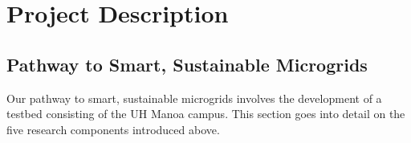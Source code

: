 \documentclass{proposalnsf}
\begin{document}

\section{Project Description}

\tableofcontents



\subsection{Pathway to Smart, Sustainable Microgrids} 

Our pathway to smart, sustainable microgrids involves the development of a testbed consisting
of the UH Manoa campus.  This section goes into detail on the five research
components introduced above. 

















\newpage



\end{document}
